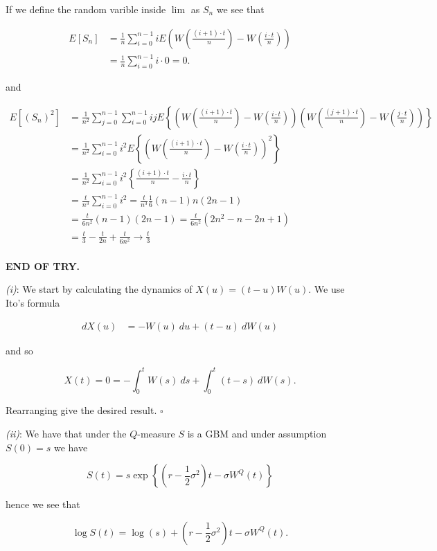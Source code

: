 \documentclass[
]{book}
\begin{document}
If we define the random varible inside \(\lim\) as \(S_n\) we see that

\begin{align*}
E[S_n]&=\frac{1}{n}\sum_{i=0}^{n-1}iE\left(W\left(\frac{(i+1)\cdot t}{n}\right)-W\left(\frac{i\cdot t}{n}\right)\right)\\
&=\frac{1}{n}\sum_{i=0}^{n-1}i\cdot0=0.
\end{align*}

and

\begin{align*}
E[(S_n)^2]&=\frac{1}{n^2}\sum_{j=0}^{n-1}\sum_{i=0}^{n-1}ijE\left\{\left(W\left(\frac{(i+1)\cdot t}{n}\right)-W\left(\frac{i\cdot t}{n}\right)\right)\left(W\left(\frac{(j+1)\cdot t}{n}\right)-W\left(\frac{j\cdot t}{n}\right)\right)\right\}\\
&=\frac{1}{n^2}\sum_{i=0}^{n-1}i^2E\left\{\left(W\left(\frac{(i+1)\cdot t}{n}\right)-W\left(\frac{i\cdot t}{n}\right)\right)^2\right\}\\
&=\frac{1}{n^2}\sum_{i=0}^{n-1}i^2\left\{\frac{(i+1)\cdot t}{n}-\frac{i\cdot t}{n}\right\}\\
&=\frac{t}{n^3}\sum_{i=0}^{n-1}i^2=\frac{t}{n^3}\frac{1}{6} (n-1) n ( 2 n-1)\\
&=\frac{t}{6n^2}(n-1) ( 2 n-1)=\frac{t}{6n^2}(2n^2-n-2n+1)\\
&=\frac{t}{3}-\frac{t}{2n}+\frac{t}{6n^2}\to \frac{t}{3}\\
\end{align*}

\textbf{END OF TRY.}

\emph{(i)}: We start by calculating the dynamics of \(X(u)=(t-u)W(u)\). We use Ito's formula

\begin{align*}
dX(u)&=-W(u)\ du+(t-u)\ dW(u)
\end{align*}

and so

\[
X(t)=0=-\int_0^t W(s)\ ds+\int_0^t(t-s)\ dW(s).
\]

Rearranging give the desired result. \(\square\)

\emph{(ii)}: We have that under the \(Q\)-measure \(S\) is a GBM and under assumption \(S(0)=s\) we have

\[
S(t)=s\exp\left\{\left(r-\frac{1}{2}\sigma^2\right)t - \sigma W^Q(t)\right\}
\]

hence we see that

\[
\log S(t)=\log(s)+\left(r-\frac{1}{2}\sigma^2\right)t - \sigma W^Q(t).
\]
\end{document}
